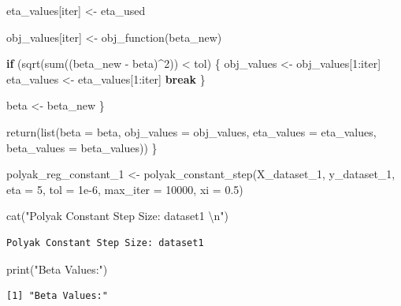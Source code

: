 \documentclass[
  letterpaper,
  DIV=11,
  numbers=noendperiod]{scrartcl}
\newenvironment{Shaded}{\begin{snugshade}}{\end{snugshade}}
\newcommand{\AttributeTok}[1]{\textcolor[rgb]{0.40,0.45,0.13}{#1}}
\newcommand{\ControlFlowTok}[1]{\textcolor[rgb]{0.00,0.23,0.31}{\textbf{#1}}}
\newcommand{\DecValTok}[1]{\textcolor[rgb]{0.68,0.00,0.00}{#1}}
\newcommand{\FloatTok}[1]{\textcolor[rgb]{0.68,0.00,0.00}{#1}}
\newcommand{\FunctionTok}[1]{\textcolor[rgb]{0.28,0.35,0.67}{#1}}
\newcommand{\NormalTok}[1]{\textcolor[rgb]{0.00,0.23,0.31}{#1}}
\newcommand{\OtherTok}[1]{\textcolor[rgb]{0.00,0.23,0.31}{#1}}
\newcommand{\SpecialCharTok}[1]{\textcolor[rgb]{0.37,0.37,0.37}{#1}}
\newcommand{\StringTok}[1]{\textcolor[rgb]{0.13,0.47,0.30}{#1}}
\begin{document}
\begin{Shaded}
\begin{Highlighting}[]
\NormalTok{    eta\_values[iter] }\OtherTok{\textless{}{-}}\NormalTok{ eta\_used}
    
\NormalTok{    obj\_values[iter] }\OtherTok{\textless{}{-}} \FunctionTok{obj\_function}\NormalTok{(beta\_new)}
    
    \ControlFlowTok{if}\NormalTok{ (}\FunctionTok{sqrt}\NormalTok{(}\FunctionTok{sum}\NormalTok{((beta\_new }\SpecialCharTok{{-}}\NormalTok{ beta)}\SpecialCharTok{\^{}}\DecValTok{2}\NormalTok{)) }\SpecialCharTok{\textless{}}\NormalTok{ tol) \{}
\NormalTok{      obj\_values }\OtherTok{\textless{}{-}}\NormalTok{ obj\_values[}\DecValTok{1}\SpecialCharTok{:}\NormalTok{iter]}
\NormalTok{      eta\_values }\OtherTok{\textless{}{-}}\NormalTok{ eta\_values[}\DecValTok{1}\SpecialCharTok{:}\NormalTok{iter]}
      \ControlFlowTok{break}
\NormalTok{    \}}
    
\NormalTok{    beta }\OtherTok{\textless{}{-}}\NormalTok{ beta\_new}
\NormalTok{  \}}
  
  \FunctionTok{return}\NormalTok{(}\FunctionTok{list}\NormalTok{(}\AttributeTok{beta =}\NormalTok{ beta, }\AttributeTok{obj\_values =}\NormalTok{ obj\_values, }\AttributeTok{eta\_values =}\NormalTok{ eta\_values, }\AttributeTok{beta\_values =}\NormalTok{ beta\_values))}
\NormalTok{\}}

\NormalTok{polyak\_reg\_constant\_1 }\OtherTok{\textless{}{-}} \FunctionTok{polyak\_constant\_step}\NormalTok{(X\_dataset\_1, y\_dataset\_1, }\AttributeTok{eta =} \DecValTok{5}\NormalTok{, }\AttributeTok{tol =} \FloatTok{1e{-}6}\NormalTok{, }\AttributeTok{max\_iter =} \DecValTok{10000}\NormalTok{, }\AttributeTok{xi =} \FloatTok{0.5}\NormalTok{)}

\FunctionTok{cat}\NormalTok{(}\StringTok{"Polyak Constant Step Size: dataset1 }\SpecialCharTok{\textbackslash{}n}\StringTok{"}\NormalTok{)}
\end{Highlighting}
\end{Shaded}

\begin{verbatim}
Polyak Constant Step Size: dataset1 
\end{verbatim}

\begin{Shaded}
\begin{Highlighting}[]
\FunctionTok{print}\NormalTok{(}\StringTok{"Beta Values:"}\NormalTok{)}
\end{Highlighting}
\end{Shaded}

\begin{verbatim}
[1] "Beta Values:"
\end{verbatim}
\end{document}
